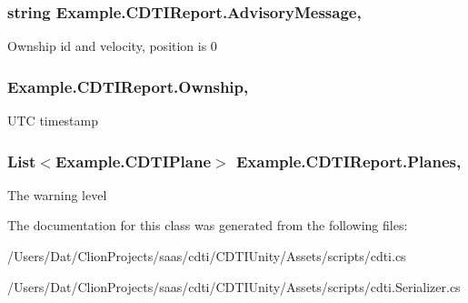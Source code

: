 \subsubsection[{\texorpdfstring{Advisory\+Message}{AdvisoryMessage}}]{\setlength{\rightskip}{0pt plus 5cm}string Example.\+C\+D\+T\+I\+Report.\+Advisory\+Message\hspace{0.3cm}{\ttfamily [get]}, {\ttfamily [set]}}\hypertarget{class_example_1_1_c_d_t_i_report_a6859a3fc5d356d9125d589e23a6cc2b9}{}\label{class_example_1_1_c_d_t_i_report_a6859a3fc5d356d9125d589e23a6cc2b9}


Ownship id and velocity, position is 0

\subsubsection[{\texorpdfstring{Ownship}{Ownship}}]{ Example.\+C\+D\+T\+I\+Report.\+Ownship\hspace{0.3cm}{\ttfamily [get]}, {\ttfamily [set]}}\hypertarget{class_example_1_1_c_d_t_i_report_ad40efe2d19d10dabc930320ba2835337}{}\label{class_example_1_1_c_d_t_i_report_ad40efe2d19d10dabc930320ba2835337}


U\+TC timestamp

\subsubsection[{\texorpdfstring{Planes}{Planes}}]{\setlength{\rightskip}{0pt plus 5cm}List$<${\bf Example.\+C\+D\+T\+I\+Plane}$>$ Example.\+C\+D\+T\+I\+Report.\+Planes\hspace{0.3cm}{\ttfamily [get]}, {\ttfamily [set]}}\hypertarget{class_example_1_1_c_d_t_i_report_a73959c38addf562d6b64ecb538db006a}{}\label{class_example_1_1_c_d_t_i_report_a73959c38addf562d6b64ecb538db006a}


The warning level



The documentation for this class was generated from the following files\+:\begin{DoxyCompactItemize}
\item 
/\+Users/\+Dat/\+Clion\+Projects/saas/cdti/\+C\+D\+T\+I\+Unity/\+Assets/scripts/cdti.\+cs\item 
/\+Users/\+Dat/\+Clion\+Projects/saas/cdti/\+C\+D\+T\+I\+Unity/\+Assets/scripts/cdti.\+Serializer.\+cs\end{DoxyCompactItemize}
